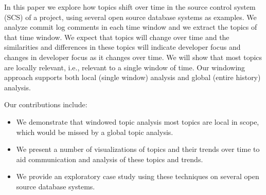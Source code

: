 \documentclass[times, 10pt,twocolumn]{article}
\begin{document}
In this paper we explore how topics shift over time in the source
control system (SCS) of a project, using several open source database
systems as examples. We analyze commit log comments in each time
window and we extract the topics of that time window. We expect that
topics will change over time and the similarities and differences in
these topics will indicate developer focus and changes in developer
focus as it changes over time. We will show that most topics are
locally relevant, i.e., relevant to a single window of time.  
Our windowing approach supports both local (single window) analysis
and global (entire history) analysis.


Our contributions include:
\begin{itemize}
\item We demonstrate that windowed topic analysis most topics are local
  in scope, which would be missed by a global topic analysis.
\item We present a number of visualizations of topics and their trends over time to aid
  communication and analysis of these topics and trends.
\item We provide an exploratory case study using these techniques on
  several open source database systems.
\end{itemize}
\end{document}
